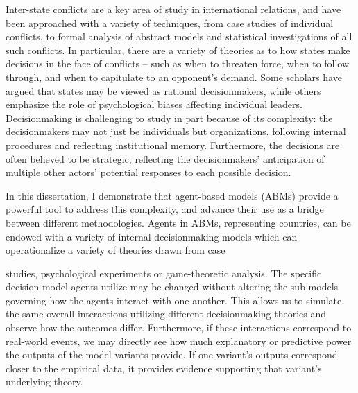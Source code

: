 \documentclass[11 pt]{report}
\begin{document}
\printglossary[style=long,title=Abbreviations]

\abstractpage

Inter-state conflicts are a key area of study in international relations, and have been approached with a variety of techniques, from case studies of individual conflicts, to formal analysis of abstract models and statistical investigations of all such conflicts. In particular, there are a variety of theories as to how states make decisions in the face of conflicts -- such as when to threaten force, when to follow through, and when to capitulate to an opponent's demand. Some scholars have argued that states may be viewed as rational decisionmakers, while others emphasize the role of psychological biases affecting individual leaders. Decisionmaking is challenging to study in part because of its complexity: the decisionmakers may not just be individuals but organizations, following internal procedures and reflecting institutional memory. Furthermore, the decisions are often believed to be strategic, reflecting the decisionmakers' anticipation of multiple other actors' potential responses to each possible decision.

In this dissertation, I demonstrate that agent-based models (ABMs) provide a powerful tool to address this complexity, and advance their use as a bridge between different methodologies. Agents in ABMs, representing countries, can be endowed with a variety of internal decisionmaking models which can operationalize a variety of theories drawn from case

\abstractmultiplepage
\noindent studies, psychological experiments or game-theoretic analysis. The specific decision model agents utilize may be changed without altering the sub-models governing how the agents interact with one another. This allows us to simulate the same overall interactions utilizing different decisionmaking theories and observe how the outcomes differ. Furthermore, if these interactions correspond to real-world events, we may directly see how much explanatory or predictive power the outputs of the model variants provide. If one variant's outputs correspond closer to the empirical data, it provides evidence supporting that variant's underlying theory.
\end{document}
